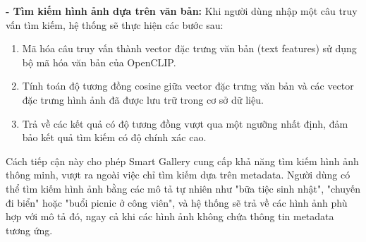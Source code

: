\textbf{- Tìm kiếm hình ảnh dựa trên văn bản:} Khi người dùng nhập một câu truy vấn tìm kiếm, hệ thống sẽ thực hiện các bước sau:

\begin{enumerate}
    \item Mã hóa câu truy vấn thành vector đặc trưng văn bản (text features) sử dụng bộ mã hóa văn bản của OpenCLIP.
    
    \item Tính toán độ tương đồng cosine giữa vector đặc trưng văn bản và các vector đặc trưng hình ảnh đã được lưu trữ trong cơ sở dữ liệu.
    
    \item Trả về các kết quả có độ tương đồng vượt qua một ngưỡng nhất định, đảm bảo kết quả tìm kiếm có độ chính xác cao.
\end{enumerate}

Cách tiếp cận này cho phép Smart Gallery cung cấp khả năng tìm kiếm hình ảnh thông minh, vượt ra ngoài việc chỉ tìm kiếm dựa trên metadata. Người dùng có thể tìm kiếm hình ảnh bằng các mô tả tự nhiên như "bữa tiệc sinh nhật", "chuyến đi biển" hoặc "buổi picnic ở công viên", và hệ thống sẽ trả về các hình ảnh phù hợp với mô tả đó, ngay cả khi các hình ảnh không chứa thông tin metadata tương ứng.




